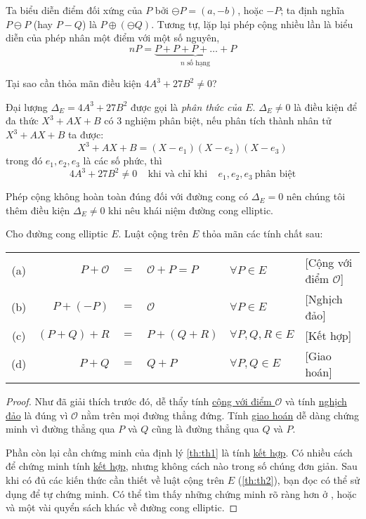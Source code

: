 Ta biểu diễn điểm đối xứng của $P$ bởi $\ominus P = (a,-b)$, hoặc  $-P$;
ta định nghĩa $P \ominus P$ (hay $P - Q$) là $P \oplus (\ominus Q)$.
Tương tự, lặp lại phép cộng nhiều lần là biểu diễn của phép nhân một điểm với một số nguyên,
$$nP = \underbrace{P + P + P + \ldots + P}_{\text{$n$ số hạng}}$$

\begin{remark}
	Tại sao cần thỏa mãn điều kiện $4A^3 + 27B^2 \neq 0$?
\end{remark}
Đại lượng $\Delta_E = 4A^3 + 27B^2$ được gọi là \textit{phân thức của $E$}.
$\Delta_E \neq 0$ là điều kiện để đa thức $X^3 + AX + B$ có 3 nghiệm phân biệt, nếu phân tích thành nhân tử $X^3 + AX + B$
ta được:
$$X^3 + AX + B = (X-e_1)(X-e_2)(X-e_3)$$
trong đó $e_1, e_2, e_3$ là các số phức, thì
$$4A^3 + 27B^2 \neq 0 \ \ \ \ \ \text{khi và chỉ khi} \ \ \ \ \ e_1, e_2, e_3 \ \text{phân biệt}$$

Phép cộng không hoàn toàn đúng đối với đường cong có $\Delta_E = 0$ nên chúng tôi thêm điều kiện $\Delta_E \neq 0$ khi nêu
khái niệm đường cong elliptic.

\begin{theorem}
	\label{th:th1}
	Cho đường cong elliptic $E$. Luật cộng trên $E$ thỏa mãn các tính chất sau:
\end{theorem}
\begin{tabular}{crclll}
	(a) \label{th:th1:a} & $P + \mathcal{O}$ & $=$ & $\mathcal{O} + P = P$ & $\forall P \in E$     & [Cộng với điểm $\mathcal{O}$] \\
	(b) \label{th:th1:b} & $P + (-P)$        & $=$ & $\mathcal{O}$         & $\forall P \in E$     & [Nghịch đảo]                  \\
	(c) \label{th:th1:c} & $(P + Q) + R$     & $=$ & $P + (Q + R)$         & $\forall P,Q,R \in E$ & [Kết hợp]                     \\
	(d) \label{th:th1:d} & $P + Q$           & $=$ & $ Q + P$              & $\forall P,Q \in E$   & [Giao hoán]                   \\
\end{tabular}

\begin{proof}
	Như đã giải thích trước đó, dễ thẩy tính \hyperref[th:th1:a]{cộng với điểm $\mathcal{O}$} và tính \hyperref[th:th1:b]{nghịch đảo}
	là đúng vì $\mathcal{O}$ nằm trên mọi đường thẳng đứng. Tính \hyperref[th:th1:d]{giao hoán} dễ dàng chứng minh vì đường thẳng qua $P$ và $Q$
	cũng là đường thẳng qua $Q$ và $P$.

	Phần còn lại cần chứng minh của định lý \ref{th:th1} là tính \hyperref[th:th1:c]{kết hợp}. Có nhiều cách để chứng minh tính \hyperref[th:th1:c]{kết hợp}, nhưng không
	cách nào trong số chúng đơn giản. Sau khi có đủ các kiến thức cần thiết
	về luật cộng trên $E$ (\ref{th:th2}), bạn đọc có thể sử dụng để tự chứng minh. Có thể tìm thấy những chứng minh rõ ràng hơn ở \cite{halmos1982graduate}, \cite{silverman2009arithmetic} hoặc \cite{silverman1992rational}
	và một vài quyển sách khác về đường cong elliptic.
\end{proof}


